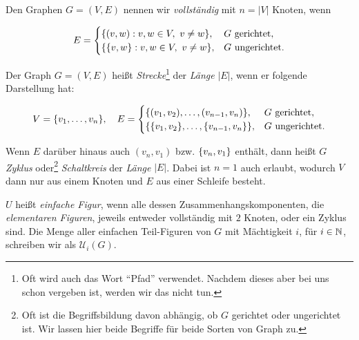         \begin{definition} \label{def:special_graphs}

            Den Graphen $G = (V, E)$ nennen wir \textit{vollständig} mit $n = |V|$ Knoten, wenn

            \begin{align*}
                E
                =
                \begin{cases}
                    {\left \{ {\left ( v, w \right )}: v, w \in V, ~ v \neq w \right \}},
                    & G ~ \text{gerichtet}, \\
                    {\left \{ {\left \{ v, w \right \}}: v, w \in V, ~ v \neq w \right \}},
                    & G ~ \text{ungerichtet}.
                \end{cases}
            \end{align*}

            Der Graph $G = (V, E)$ heißt \textit{Strecke}\footnote{Oft wird auch das Wort \enquote{Pfad} verwendet. Nachdem dieses aber bei uns schon vergeben ist, werden wir das nicht tun.} der \textit{Länge} $|E|$, wenn er folgende Darstellung hat:

            \begin{align*}
                V = {\left \{ v_1, \dots, v_n \right \}},
                \quad
                E
                =
                \begin{cases}
                    {\left \{ (v_1, v_2), \dots, (v_{n-1}, v_n) \right \}},
                    & G ~ \text{gerichtet}, \\
                    {\left \{ 
                        {\left \{ v_1, v_2 \right \}},
                        \dots,
                        {\left \{ v_{n-1}, v_n \right \}}
                     \right \}},
                    & G ~ \text{ungerichtet}.
                \end{cases}
            \end{align*}

            Wenn $E$ darüber hinaus auch $(v_n, v_1)$ bzw. ${\left \{ v_n, v_1 \right \}}$ enthält, dann heißt $G$ \textit{Zyklus} oder\footnote{Oft ist die Begriffsbildung davon abhängig, ob $G$ gerichtet oder ungerichtet ist. Wir lassen hier beide Begriffe für beide Sorten von Graph zu.} \textit{Schaltkreis} der \textit{Länge} $|E|$.
            Dabei ist $n = 1$ auch erlaubt, wodurch $V$ dann nur aus einem Knoten und $E$ aus einer Schleife besteht.

            $U$ heißt \textit{einfache Figur}, wenn alle dessen Zusammenhangskomponenten, die \textit{elementaren Figuren}, jeweils entweder vollständig mit $2$ Knoten, oder ein Zyklus sind.
            Die Menge aller einfachen Teil-Figuren von $G$ mit Mächtigkeit $i$, für $i \in \mathbb N$, schreiben wir als $\mathcal U_i(G)$.


\end{definition}
